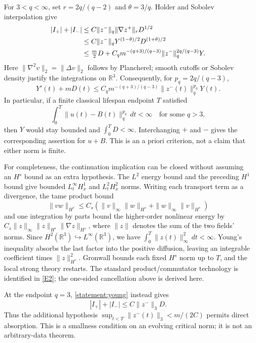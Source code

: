 \documentclass[11pt,a4paper]{article}
\newcommand{\R}{\mathbb{R}}
\newcommand{\eref}[2]{\hyperlink{extra:#1:#2}{[E#2]}}
\numberwithin{equation}{section}
\begin{document}
For $3<q<\infty$, set $r=2q/(q-2)$ and $\theta=3/q$.
Holder and Sobolev interpolation give
\begin{align}
 |I_+|+|I_-|
 &\leq C\|z^-\|_q\|\nabla z^+\|_r D^{1/2} \notag\\
 &\leq C\|z^-\|_q Y^{(1-\theta)/2}D^{(1+\theta)/2} \notag\\
 &\leq \tfrac m2D+
 C_qm^{-(q+3)/(q-3)}\|z^-\|_q^{2q/(q-3)}Y.
 \label{statement:young}
\end{align}
Here $\|\nabla^2v\|_2=\|\Delta v\|_2$ follows by Plancherel; smooth
cutoffs or Sobolev density justify the integrations on $\R^3$.
Consequently, for $p_q=2q/(q-3)$,
\begin{equation}\label{statement:gronwall}
 Y'(t)+mD(t)\leq
 C_qm^{-(q+3)/(q-3)}\|z^-(t)\|_q^{p_q}Y(t).
\end{equation}
In particular, if a finite classical lifespan endpoint $T$ satisfied
\begin{equation}\label{statement:missing}
 \int_0^T\|u(t)-B(t)\|_q^{p_q}\,dt<\infty
 \quad\text{for some }q>3,
\end{equation}
then $Y$ would stay bounded and $\int_0^TD<\infty$.
Interchanging $+$ and $-$ gives the corresponding assertion for $u+B$.
This is an a priori criterion, not a claim that either norm is finite.

For completeness, the continuation implication can be closed without
assuming an $H^s$ bound as an extra hypothesis. The $L^2$ energy bound
and the preceding $H^1$ bound give bounded $L^\infty_tH^1_x$ and
$L^2_tH^2_x$ norms. Writing each transport term as a divergence, the tame product bound
\[
 \|vw\|_{H^s}\leq C_s(\|v\|_\infty\|w\|_{H^s}
                          +\|w\|_\infty\|v\|_{H^s})
\]
and one integration by parts bound the higher-order nonlinear energy by
$C_s\|z\|_\infty\|z\|_{H^s}\|\nabla z\|_{H^s}$, where $\|z\|$
denotes the sum of the two fields' norms. Since
$H^2(\R^3)\hookrightarrow L^\infty(\R^3)$, we have
$\int_0^T\|z(t)\|_\infty^2\,dt<\infty$.
Young's inequality absorbs the last factor into the positive diffusion,
leaving an integrable coefficient times $\|z\|_{H^s}^2$.
Gronwall bounds each fixed $H^s$ norm up to $T$, and the local strong
theory restarts. The standard product/commutator technology is identified
in \eref{statement}{2}; the one-sided cancellation above is derived here.

At the endpoint $q=3$, \eqref{statement:young} instead gives
\[
 |I_+|+|I_-|\leq C\|z^-\|_3D.
\]
Thus the additional hypothesis
$\sup_{t<T}\|z^-(t)\|_3<m/(2C)$ permits direct absorption. This is a
smallness condition on an evolving critical norm; it is not an
arbitrary-data theorem.
\end{document}
